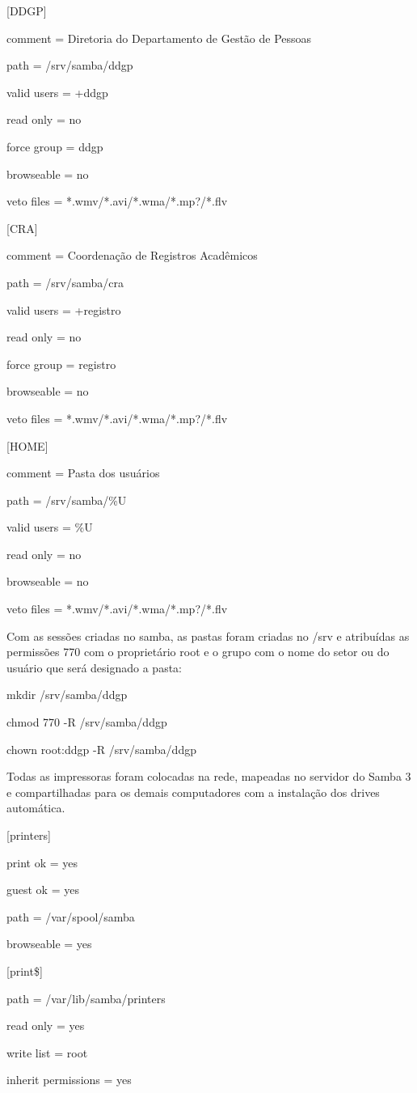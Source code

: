 [DDGP] 

comment = Diretoria do Departamento de Gestão de Pessoas

path = /srv/samba/ddgp

valid users = +ddgp

read only = no

force group = ddgp

browseable = no

veto files = *.wmv/*.avi/*.wma/*.mp?/*.flv

[CRA] 

comment = Coordenação de Registros Acadêmicos

path = /srv/samba/cra

valid users = +registro

read only = no

force group = registro

browseable = no

veto files = *.wmv/*.avi/*.wma/*.mp?/*.flv


[HOME] 

comment = Pasta dos usuários

path = /srv/samba/\%U

valid users = \%U

read only = no

browseable = no

veto files = *.wmv/*.avi/*.wma/*.mp?/*.flv

Com as sessões criadas no samba, as pastas foram criadas no /srv e atribuídas as permissões 770 com o proprietário root e o grupo com o nome do setor ou do usuário que será designado a pasta:

mkdir /srv/samba/ddgp

chmod 770 -R /srv/samba/ddgp

chown root:ddgp -R /srv/samba/ddgp

Todas as impressoras foram colocadas na rede, mapeadas no servidor do Samba 3 e compartilhadas para os demais computadores com a instalação dos drives automática.

[printers] 

print ok = yes 

guest ok = yes

path = /var/spool/samba 

browseable = yes

[print\$] 

path = /var/lib/samba/printers 

read only = yes

write list = root 

inherit permissions = yes


